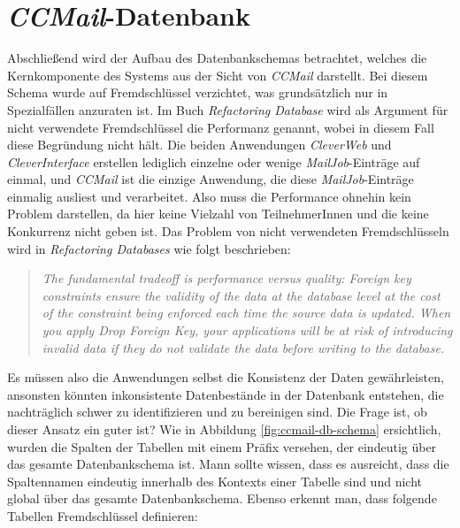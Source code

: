 \section{\emph{CCMail}-Datenbank}
\label{sec:ccmail-datanbank}
Abschließend wird der Aufbau des Datenbankschemas betrachtet, welches die Kernkomponente des Systems aus der Sicht von \emph{CCMail} darstellt. Bei diesem Schema wurde auf Fremdschlüssel verzichtet, was grundsätzlich nur in Spezialfällen anzuraten ist.
\newline
\newline 
Im Buch \emph{Refactoring Database} \cite[213]{refactoreDatabase} wird als Argument für nicht verwendete Fremdschlüssel die Performanz genannt, wobei in diesem Fall diese Begründung nicht hält. Die beiden Anwendungen \emph{CleverWeb} und \emph{CleverInterface} erstellen lediglich einzelne oder wenige \emph{MailJob}-Einträge auf einmal, und \emph{CCMail} ist die einzige Anwendung, die diese \emph{MailJob}-Einträge einmalig ausliest und verarbeitet. Also muss die Performance ohnehin kein Problem darstellen, da hier keine Vielzahl von TeilnehmerInnen und die keine Konkurrenz nicht geben ist. Das Problem von nicht verwendeten Fremdschlüsseln wird in \emph{Refactoring Databases} \cite[213]{refactoreDatabase} wie folgt beschrieben:
\newpage
\begin{quote}
\emph{The fundamental tradeoff is performance versus quality: Foreign key constraints ensure the validity of the data at the database level at the cost of the constraint being enforced each time the source data is updated. When you apply Drop Foreign Key, your applications will be at risk of introducing invalid data if they do not validate the data before writing to the database.}
\end{quote}
Es müssen also die Anwendungen selbst die Konsistenz der Daten gewährleisten, ansonsten könnten inkonsistente Datenbestände in der Datenbank entstehen, die nachträglich schwer zu identifizieren und zu bereinigen sind. Die Frage ist, ob dieser Ansatz ein guter ist?
\newline
\newline
Wie in Abbildung \ref{fig:ccmail-db-schema} ersichtlich, wurden die Spalten der Tabellen mit einem Präfix versehen, der eindeutig über das gesamte Datenbankschema ist. Mann sollte wissen, dass es ausreicht, dass die Spaltennamen eindeutig innerhalb des Kontexts einer Tabelle sind und nicht global über das gesamte Datenbankschema. Ebenso erkennt man, dass folgende Tabellen Fremdschlüssel definieren: 
